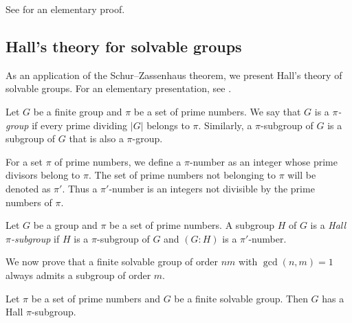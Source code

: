 See \cite{MR294497} for an elementary proof. 

\subsection{Hall's theory for solvable groups}

As an application of the Schur--Zassenhaus theorem, 
we present Hall's theory of solvable groups. 
For an elementary presentation, see \cite{MR600654}. 

\begin{definition}
Let $G$ be a finite group and $\pi$ be a set of prime numbers. We say that 
$G$ is a \emph{$\pi$-group} if every prime dividing $|G|$ belongs to $\pi$. 
Similarly, a $\pi$-subgroup of $G$ is a subgroup of $G$ that is also a $\pi$-group.  
\end{definition}

For a set $\pi$ of prime numbers, 
we define a $\pi$-number as an integer whose prime divisors 
belong to $\pi$. The set of prime numbers not belonging to $\pi$ will be denoted 
as $\pi'$. Thus a $\pi'$-number is an integers not divisible by 
the prime numbers of $\pi$. 

\begin{definition}
	Let $G$ be a group and $\pi$ be a set of prime numbers. A subgroup $H$ of $G$ 
    is a \emph{Hall $\pi$-subgroup} if $H$ is a $\pi$-subgroup of $G$ and 
    $(G:H)$ is a $\pi'$-number.
\end{definition}

We now prove that a finite solvable group of order $nm$ with $\gcd(n,m)=1$ 
always admits a subgroup of order $m$. 

\begin{theorem}
 	\label{theorem:HallE}
	Let $\pi$ be a set of prime numbers and $G$ be a finite solvable group. 
    Then $G$ has a Hall $\pi$-subgroup. 
\end{theorem}

